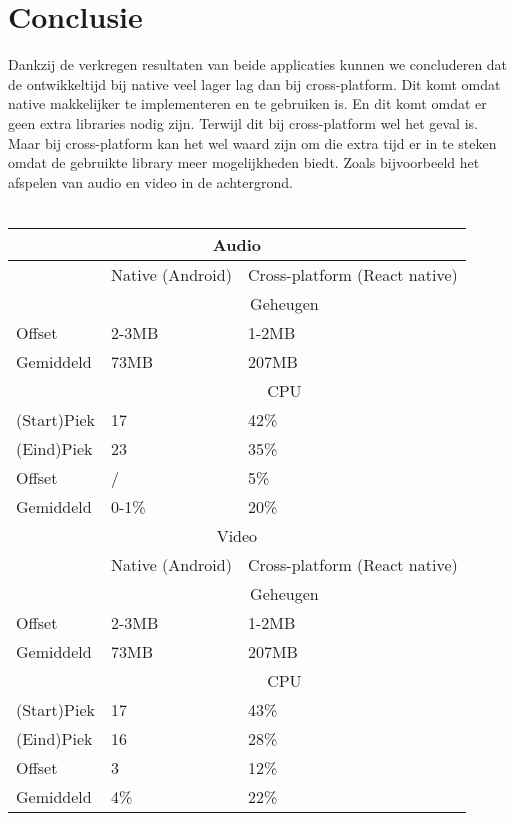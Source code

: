 \section{Conclusie}
Dankzij de verkregen resultaten van beide applicaties kunnen we concluderen dat de ontwikkeltijd bij 
native veel lager lag dan bij cross-platform. Dit komt omdat native makkelijker te implementeren en te gebruiken is.
En dit komt omdat er geen extra libraries nodig zijn. Terwijl dit bij cross-platform wel het geval is.
Maar bij cross-platform kan het wel waard zijn om die extra tijd er in te steken omdat de gebruikte library 
meer mogelijkheden biedt. Zoals bijvoorbeeld het afspelen van audio en video in de achtergrond.
\\\\
\begin{tabular}{ |p{3cm}||p{5cm}|p{5cm}| }
    \hline
    \multicolumn{3}{|c|}{Audio} \\ 
    \hline
     & Native (Android) & Cross-platform (React native) \\
    \hline
     & \multicolumn{2}{|c|}{Geheugen} \\ 
    \hline
    Offset & 2-3MB & 1-2MB \\
    Gemiddeld & 73MB & 207MB \\
    \hline
     & \multicolumn{2}{|c|}{CPU} \\
    \hline
    (Start)Piek & 17 & 42\% \\
    (Eind)Piek & 23 & 35\% \\
    Offset & / & 5\% \\
    Gemiddeld & 0-1\% & 20\% \\
    \hline
    \multicolumn{3}{|c|}{Video} \\ 
    \hline
     & Native (Android) & Cross-platform (React native) \\
    \hline
     & \multicolumn{2}{|c|}{Geheugen} \\ 
    \hline
    Offset & 2-3MB & 1-2MB \\
    Gemiddeld & 73MB & 207MB \\
    \hline
     & \multicolumn{2}{|c|}{CPU} \\
    \hline
    (Start)Piek & 17 & 43\% \\
    (Eind)Piek & 16 & 28\% \\
    Offset & 3 & 12\% \\
    Gemiddeld & 4\% & 22\% \\
    \hline
\end{tabular}
\\\\
